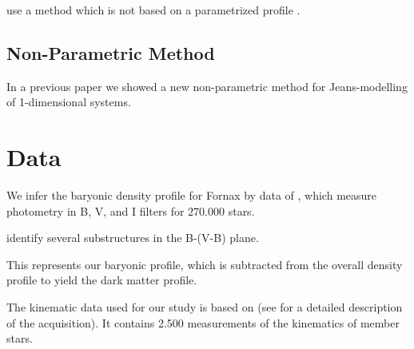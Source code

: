 \citep{Ibata+2011} use a method which is not based on a parametrized profile .



\subsection{Non-Parametric Method}
In a previous paper \citet{Steger+2014} we showed a new non-parametric
method for Jeans-modelling of 1-dimensional systems.



\section{Data}
We infer the baryonic density profile for Fornax by data of
\cite{deBoer+2012b}, which measure photometry in B, V, and I filters
for 270.000 stars.


\cite{deBoer+2013} identify several substructures in the B-(V-B)
plane.  

This represents our baryonic profile, which is subtracted from the
overall density profile to yield the dark matter profile.


The kinematic data used for our study is based on \citep{Walker2009b}
(see \citep{Walker2009a} for a detailed description of the
acquisition). It contains 2.500 measurements of the kinematics of member stars.





